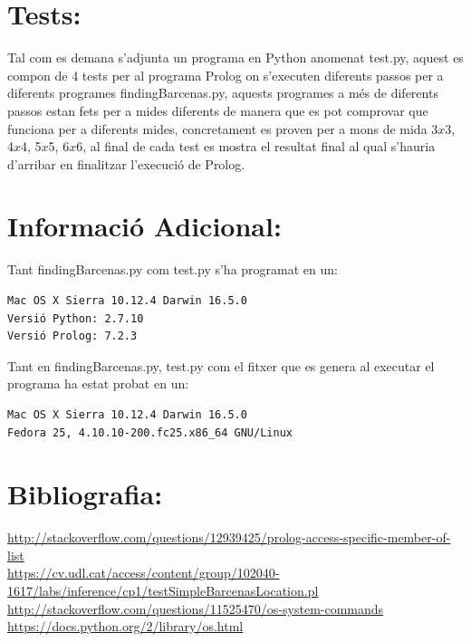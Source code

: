 \documentclass[11pt]{article}
\begin{document}
\section{Tests:}
Tal com es demana s'adjunta un programa en Python anomenat test.py, aquest es compon de 4 tests per al programa Prolog on s'executen diferents passos per a diferents programes findingBarcenas.py, aquests programes a més de diferents passos estan fets per a mides diferents de manera que es pot comprovar que funciona per a diferents mides, concretament es proven per a mons de mida 3$x$3, 4$x$4, 5$x$5, 6$x$6, al final de cada test es mostra el resultat final al qual s'hauria d'arribar en finalitzar l'execució de Prolog.
\newpage
\section{Informació Adicional:}
Tant findingBarcenas.py com test.py s'ha programat en un:
\begin{verbatim}
Mac OS X Sierra 10.12.4 Darwin 16.5.0
Versió Python: 2.7.10
Versió Prolog: 7.2.3
\end{verbatim}
Tant en findingBarcenas.py, test.py com el fitxer que es genera al executar el programa ha estat probat en un:
\begin{verbatim}
Mac OS X Sierra 10.12.4 Darwin 16.5.0
Fedora 25, 4.10.10-200.fc25.x86_64 GNU/Linux
\end{verbatim}

\section{Bibliografia:} 
\url{http://stackoverflow.com/questions/12939425/prolog-access-specific-member-of-list}\\
\url{https://cv.udl.cat/access/content/group/102040-1617/labs/inference/cp1/testSimpleBarcenasLocation.pl}\\
\url{http://stackoverflow.com/questions/11525470/os-system-commands}\\
\url{https://docs.python.org/2/library/os.html}
\end{document}
